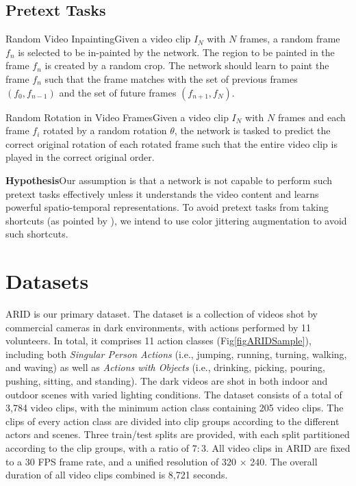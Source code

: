 \documentclass[conference]{IEEEtran}
\begin{document}
\subsection{Pretext Tasks}
Random Video Inpainting\textendash Given a video clip $I_N$ with $N$ frames, a random frame $f_n$ is selected to be in-painted by the network. The region to be painted in the frame $f_n$ is created by a random crop. The network should learn to paint the frame $f_n$ such that the frame matches with the set of previous frames $(f_0, f_{n-1})$ and the set of future frames $(f_{n+1}, f_N)$. 

Random Rotation in Video Frames\textendash Given a video clip $I_N$ with $N$ frames and each frame $f_i$ rotated by a random rotation $\theta$, the network is tasked to predict the correct original rotation of each rotated frame such that the entire video clip is played in the correct original order.

\vspace{8pt}

\textbf{Hypothesis}\textendash Our assumption is that a network is not capable to perform such pretext tasks effectively unless it understands the video content and learns powerful spatio-temporal representations. To avoid pretext tasks from taking shortcuts (as pointed by \cite{Doersch2015UnsupervisedVR}), we intend to use color jittering augmentation to avoid such shortcuts.

\section{Datasets}
ARID \cite{Xu2020ARIDAN} is our primary dataset. The dataset is a collection of videos shot by commercial cameras in dark environments, with
actions performed by 11 volunteers. In total, it comprises 11 action classes (Fig\ref{figARIDSample}), including both \textit{Singular Person Actions} (i.e., jumping, running, turning, walking, and waving) as well as \textit{Actions with Objects} (i.e., drinking, picking, pouring, pushing, sitting, and standing). The dark videos are shot in both indoor and outdoor scenes with varied lighting conditions. The dataset consists of a total of 3,784 video clips, with the minimum action class containing 205 video clips. The clips of every action class are divided into clip groups
according to the different actors and scenes. Three train/test splits are provided, with each split partitioned according to the clip groups, with a ratio of $7 : 3$. All video clips in ARID are fixed to a 30 FPS frame rate, and a unified resolution of 320 × 240. The overall duration of all video clips combined is 8,721 seconds.
\end{document}
